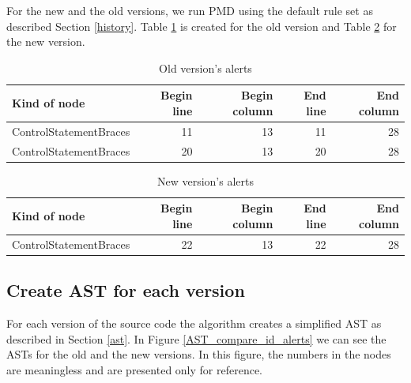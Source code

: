 \documentclass[
]{article}
\begin{document}
For the new and the old versions, we run PMD using the default rule set
as described Section \ref{history}. Table \ref{old_alerts} is created
for the old version and Table \ref{new_alerts} for the new version.

\small

\begin{table}[H]

\caption{\label{tab:unnamed-chunk-3}Old version's alerts\label{old_alerts}}
\centering
\begin{tabular}[t]{l|r|r|r|r}
\hline
Kind of node & Begin line & Begin column & End line & End column\\
\hline
\rowcolor{gray!6}  ControlStatementBraces & 11 & 13 & 11 & 28\\
\hline
ControlStatementBraces & 20 & 13 & 20 & 28\\
\hline
\end{tabular}
\end{table}

\normalsize

\small

\begin{table}[H]

\caption{\label{tab:unnamed-chunk-4}New version's alerts\label{new_alerts}}
\centering
\begin{tabular}[t]{l|r|r|r|r}
\hline
Kind of node & Begin line & Begin column & End line & End column\\
\hline
\rowcolor{gray!6}  ControlStatementBraces & 22 & 13 & 22 & 28\\
\hline
\end{tabular}
\end{table}

\normalsize

\subsection{Create AST for each version}

For each version of the source code the algorithm creates a simplified
AST as described in Section \ref{ast}. In Figure
\ref{AST_compare_id_alerts} we can see the ASTs for the old and the new
versions. In this figure, the numbers in the nodes are meaningless and
are presented only for reference.

\small
\end{document}
